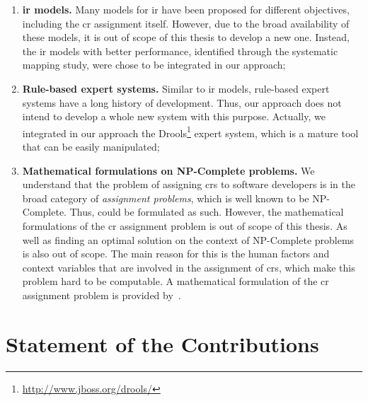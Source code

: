 {\begin{enumerate}
  \item \textbf{\ac{ir} models.} Many models for \ac{ir} have been proposed for
  different objectives, including the \ac{cr} assignment itself. However, due to
  the broad availability of these models, it is out of scope of this thesis to
  develop a new one. Instead, the \ac{ir} models with better performance,
  identified through the systematic mapping study, were chose to be
  integrated in our approach;
  
  \item \textbf{Rule-based expert systems.} Similar to \ac{ir} models,
  rule-based expert systems have a long history of development. Thus, our
  approach does not intend to develop a whole new system with this purpose.
  Actually, we integrated in our approach the
  Drools\footnote{\url{http://www.jboss.org/drools/}} expert system, which is a
  mature tool that can be easily manipulated;
  
  \item \textbf{Mathematical formulations on NP-Complete problems.} We
  understand that the problem of assigning \acp{cr} to software developers is in
  the broad category of \emph{assignment problems}, which is well known to be
  NP-Complete. Thus, could be formulated as such. However, the mathematical
  formulations of the \ac{cr} assignment problem is out of scope of this thesis.
  As well as finding an optimal solution on the context of NP-Complete problems
  is also out of scope. The main reason for this is the human factors and
  context variables that are involved in the assignment of \acp{cr}, which
  make this problem hard to be computable. A mathematical formulation of the
  \ac{cr} assignment problem is provided by~.
\end{enumerate}

\section{Statement of the Contributions}
\lipsum[6-7]

}
